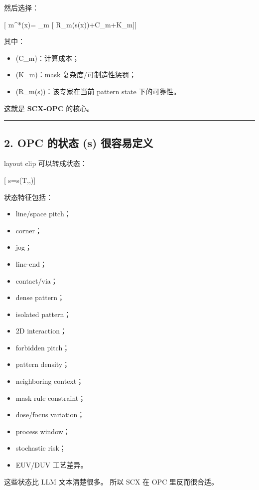 \documentclass[
  12pt,
]{ctexart}
\providecommand{\tightlist}{%
  \setlength{\itemsep}{0pt}\setlength{\parskip}{0pt}}
\begin{document}
然后选择：

{[} m\^{}*(x)= \arg\min\_m {[} R\_m(s(x))+\lambda C\_m+\beta K\_m{]}{]}

其中：

\begin{itemize}
\tightlist
\item
  (C\_m)：计算成本；
\item
  (K\_m)：mask 复杂度/可制造性惩罚；
\item
  (R\_m(s))：该专家在当前 pattern state 下的可靠性。
\end{itemize}

这就是 \textbf{SCX-OPC} 的核心。

\begin{center}\rule{0.5\linewidth}{0.5pt}\end{center}

\subsection{2. OPC 的状态 (s)
很容易定义}\label{opc-ux7684ux72b6ux6001-s-ux5f88ux5bb9ux6613ux5b9aux4e49}

layout clip 可以转成状态：

{[} s=s(T,,){]}

状态特征包括：

\begin{itemize}
\tightlist
\item
  line/space pitch；
\item
  corner；
\item
  jog；
\item
  line-end；
\item
  contact/via；
\item
  dense pattern；
\item
  isolated pattern；
\item
  2D interaction；
\item
  forbidden pitch；
\item
  pattern density；
\item
  neighboring context；
\item
  mask rule constraint；
\item
  dose/focus variation；
\item
  process window；
\item
  stochastic risk；
\item
  EUV/DUV 工艺差异。
\end{itemize}

这些状态比 LLM 文本清楚很多。 所以 SCX 在 OPC 里反而很合适。
\end{document}
